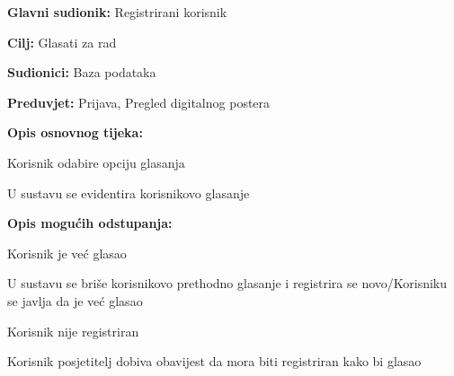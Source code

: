 					\noindent {}
					\begin{packed_item}
						
						\item \textbf{Glavni sudionik: }Registrirani korisnik
						\item  \textbf{Cilj:} Glasati za rad
						\item  \textbf{Sudionici:} Baza podataka
						\item  \textbf{Preduvjet:} Prijava, Pregled digitalnog postera
						\item  \textbf{Opis osnovnog tijeka:}
						
						\item[] \begin{packed_enum}
							
							\item Korisnik odabire opciju glasanja
							\item U sustavu se evidentira korisnikovo glasanje
						\end{packed_enum}
						
						\item  \textbf{Opis mogućih odstupanja:}
						
						\item[] \begin{packed_item}
							
							\item[2.a] Korisnik je već glasao
							\item[] \begin{packed_enum}
								\item U sustavu se briše korisnikovo prethodno glasanje i registrira se novo/Korisniku se javlja da je već glasao
							\end{packed_enum}
							\item[2.b] Korisnik nije registriran
								\item[] \begin{packed_enum}
									\item Korisnik posjetitelj dobiva obavijest da mora biti registriran kako bi glasao
							\end{packed_enum}
						\end{packed_item}
					\end{packed_item}
					
